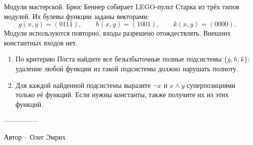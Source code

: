 \question
Модули мастерской. Брюс Беннер собирает LEGO-пульт Старка из трёх типов модулей. Их булевы функции заданы векторами:
\[
g(x,y)=(0111),\qquad h(x,y)=(1001),\qquad k(x,y)=(0000).
\]
Модули используются повторно, входы разрешено отождествлять. Внешних константных входов нет.
\begin{enumerate}
\item По критерию Поста найдите все безызбыточные полные подсистемы $\{g,h,k\}$: удаление любой функции из такой подсистемы должно нарушать полноту.
\item Для каждой найденной подсистемы выразите $\neg x$ и $x\land y$ суперпозициями только её функций. Если нужны константы, также получите их из этих функций.
\end{enumerate}

---------------

Автор -- Олег Эмрих

